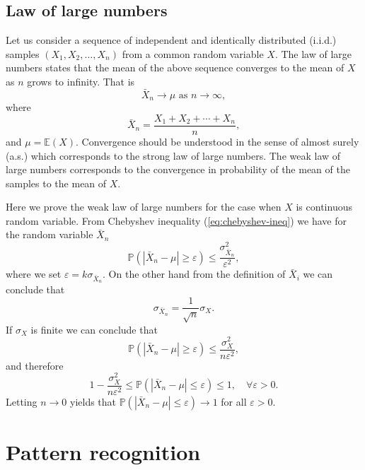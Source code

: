 \documentclass[11pt]{article}
\newcommand{\Pro}{\mathbb{P}}
\begin{document}
\subsection{Law of large numbers}
Let us consider a sequence of independent and identically distributed
(i.i.d.) samples $(X_1, X_2, \dots, X_n)$ from a common random
variable $X$. The law of large numbers states that the mean of the
above sequence converges to the mean of $X$ as $n$ grows to
infinity. That is
\begin{equation}
  \bar{X}_n \rightarrow \mu \text{ as } n \rightarrow \infty,
\end{equation}
where
\begin{equation}
  \bar{X}_n = \frac{X_1 + X_2 + \cdots + X_n}{n},
\end{equation}
and $\mu = \mathbb{E}(X)$. Convergence should be understood in the
sense of almost surely (a.s.) which corresponds to the strong law of
large numbers. The weak law of large numbers corresponds to the
convergence in probability of the mean of the samples to the mean of
$X$.

Here we prove the weak law of large numbers for the case when $X$ is
continuous random variable. From Chebyshev inequality
(\ref{eq:chebyshev-ineq}) we have for the random variable $\bar{X}_n$
\begin{equation} 
  \Pro(|\bar{X}_n-\mu| \geq \varepsilon) \leq
  \frac{\sigma_{\bar{X}_n}^2}{\varepsilon^2},
\end{equation}
where we set $\varepsilon = k \sigma_{\bar{X}_n}$. On the other hand
from the definition of $\bar{X}_i$ we can conclude that
\begin{equation*}
  \sigma_{\bar{X}_n} = \frac{1}{\sqrt{n}} \sigma_X.
\end{equation*}
If $\sigma_X$ is finite we can conclude that
\begin{equation*} 
  \Pro(|\bar{X}_n-\mu| \geq \varepsilon) \leq \frac{\sigma_{X}^2}{n
    \varepsilon^2},
\end{equation*}
and therefore
\begin{equation} 
  1- \frac{\sigma_{X}^2}{n \varepsilon^2} \leq \Pro(|\bar{X}_n-\mu|
  \leq \varepsilon) \leq 1, \quad \forall \varepsilon > 0.
\end{equation}
Letting $n \rightarrow 0$ yields that $ \Pro(|\bar{X}_n-\mu| \leq
\varepsilon) \rightarrow 1$ for all $\varepsilon > 0$.

\section{Pattern recognition}
\end{document}
